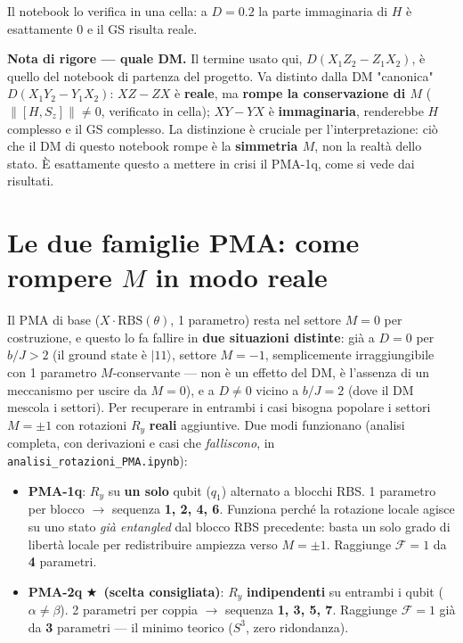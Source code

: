 \documentclass[11pt,a4paper]{article}
\begin{document}
Il notebook lo verifica in una cella: a $D=0.2$ la parte immaginaria di
$H$ è esattamente $0$ e il GS risulta reale.

\begin{editnote}
\textbf{Nota di rigore --- quale DM.} Il termine usato qui,
$D(X_1Z_2-Z_1X_2)$, è quello del notebook di partenza del progetto. Va
distinto dalla DM "canonica" $D(X_1Y_2-Y_1X_2)$:
$XZ-ZX$ è \textbf{reale}, ma \textbf{rompe la conservazione di $M$}
($\|[H,S_z]\|\neq0$, verificato in cella); $XY-YX$ è
\textbf{immaginaria}, renderebbe $H$ complesso e il GS complesso. La
distinzione è cruciale per l'interpretazione: ciò che il DM di questo
notebook rompe è la \textbf{simmetria $M$}, non la realtà dello stato.
È esattamente questo a mettere in crisi il PMA-1q, come si vede dai
risultati.
\end{editnote}

\section{Le due famiglie PMA: come rompere $M$ in modo reale}

Il PMA di base ($X\cdot\mathrm{RBS}(\theta)$, 1 parametro) resta nel
settore $M=0$ per costruzione, e questo lo fa fallire in \textbf{due
situazioni distinte}: già a $D=0$ per $b/J>2$ (il ground state è
$|11\rangle$, settore $M=-1$, semplicemente irraggiungibile con 1
parametro $M$-conservante --- non è un effetto del DM, è l'assenza di
un meccanismo per uscire da $M=0$), e a $D\neq0$ vicino a $b/J=2$ (dove
il DM mescola i settori). Per recuperare in entrambi i casi bisogna
popolare i settori $M=\pm1$ con rotazioni $R_y$ \textbf{reali}
aggiuntive. Due modi funzionano (analisi completa, con derivazioni e
casi che \emph{falliscono}, in \texttt{analisi\_rotazioni\_PMA.ipynb}):

\begin{itemize}[leftmargin=1.3em,itemsep=0.25em]
\item \textbf{PMA-1q}: $R_y$ su \textbf{un solo} qubit ($q_1$) alternato
a blocchi RBS. 1 parametro per blocco $\to$ sequenza \textbf{1, 2, 4,
6}. Funziona perché la rotazione locale agisce su uno stato \emph{già
entangled} dal blocco RBS precedente: basta un solo grado di libertà
locale per redistribuire ampiezza verso $M=\pm1$. Raggiunge
$\mathcal F=1$ da \textbf{4} parametri.
\item \textbf{PMA-2q} $\bigstar$\ \textbf{(scelta consigliata)}: $R_y$
\textbf{indipendenti} su entrambi i qubit ($\alpha\neq\beta$). 2
parametri per coppia $\to$ sequenza \textbf{1, 3, 5, 7}. Raggiunge
$\mathcal F=1$ già da \textbf{3} parametri --- il minimo teorico ($S^3$,
zero ridondanza).
\end{itemize}
\end{document}
